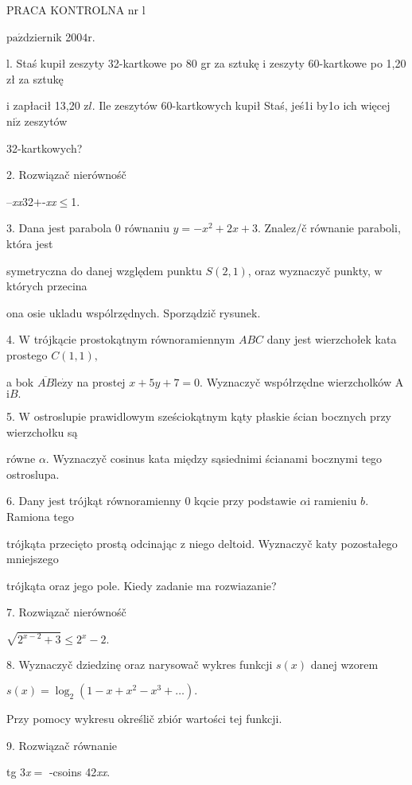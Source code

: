 \documentclass[a4paper,12pt]{article}
\begin{document}
PRACA KONTROLNA nr l

$\mathrm{p}\mathrm{a}\acute{\mathrm{z}}$dziernik 2$004\mathrm{r}.$

l. Staś kupił zeszyty 32-kartkowe po 80 gr za sztukę $\mathrm{i}$ zeszyty 60-kartkowe po 1,20 zł za sztukę

$\mathrm{i}$ zapłacił 13,20 $\mathrm{z}l$. Ile zeszytów 60-kartkowych kupił Staś, jeś1i by1o ich więcej $\mathrm{n}\mathrm{i}\dot{\mathrm{z}}$ zeszytów

32-kartkowych?

2. Rozwiązač nierównośč

--{\it xx}32$+$-{\it xx}$\leq$1.

3. Dana jest parabola $0$ równaniu $y = -x^{2}+2x+3$. Znalez/č równanie paraboli, która jest

symetryczna do danej względem punktu $S(2,1)$, oraz wyznaczyč punkty, $\mathrm{w}$ których przecina

ona osie ukladu wspólrzędnych. Sporządzič rysunek.

4. $\mathrm{W}$ trójkącie prostokątnym równoramiennym $ABC$ dany jest wierzchołek kata prostego $C(1,1),$

a bok $\overline{AB}\mathrm{l}\mathrm{e}\dot{\mathrm{z}}\mathrm{y}$ na prostej $x+5y+7=0$. Wyznaczyč współrzędne wierzcholków A $\mathrm{i}B.$

5. $\mathrm{W}$ ostroslupie prawidlowym sześciokątnym kąty płaskie ścian bocznych przy wierzchołku są

równe $\alpha$. Wyznaczyč cosinus kata między sąsiednimi ścianami bocznymi tego ostroslupa.

6. Dany jest trójkąt równoramienny $0$ kqcie przy podstawie $\alpha \mathrm{i}$ ramieniu $b$. Ramiona tego

trójkąta przecięto prostą odcinając $\mathrm{z}$ niego deltoid. Wyznaczyč katy pozostałego mniejszego

trójkąta oraz jego pole. Kiedy zadanie ma rozwiazanie?

7. Rozwiązač nierównośč

$\sqrt{2^{x-2}+3}\leq 2^{x}-2.$

8. Wyznaczyč dziedzinę oraz narysowač wykres funkcji $s(x)$ danej wzorem

$s(x)=\log_{2}(1-x+x^{2}-x^{3}+\ldots).$

Przy pomocy wykresu określič zbiór wartości tej funkcji.

9. Rozwiązač równanie

tg 3{\it x}$=$ -csoins 42{\it xx}.
\end{document}
